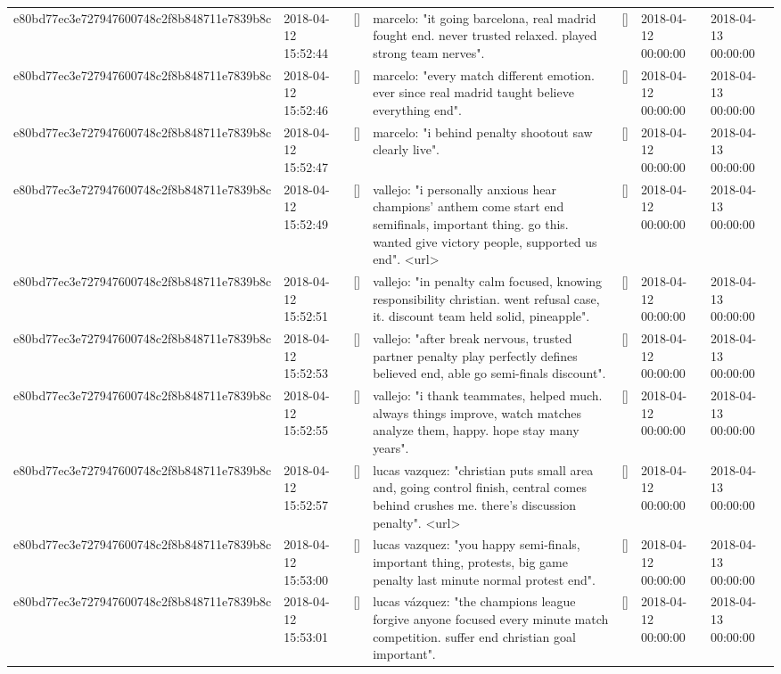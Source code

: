 \begin{tabular}{lllllll}
e80bd77ec3e727947600748c2f8b848711e7839b8c & 2018-04-12 15:52:44 & [] & marcelo: "it going barcelona, real madrid fought end. never trusted relaxed. played strong team nerves". & [] & 2018-04-12 00:00:00 & 2018-04-13 00:00:00 \\
e80bd77ec3e727947600748c2f8b848711e7839b8c & 2018-04-12 15:52:46 & [] & marcelo: "every match different emotion. ever since real madrid taught believe everything end". & [] & 2018-04-12 00:00:00 & 2018-04-13 00:00:00 \\
e80bd77ec3e727947600748c2f8b848711e7839b8c & 2018-04-12 15:52:47 & [] & marcelo: "i behind penalty shootout saw clearly live". & [] & 2018-04-12 00:00:00 & 2018-04-13 00:00:00 \\
e80bd77ec3e727947600748c2f8b848711e7839b8c & 2018-04-12 15:52:49 & [] & vallejo: "i personally anxious hear champions' anthem come start end semifinals, important thing. go this. wanted give victory people, supported us end". <url> & [] & 2018-04-12 00:00:00 & 2018-04-13 00:00:00 \\
e80bd77ec3e727947600748c2f8b848711e7839b8c & 2018-04-12 15:52:51 & [] & vallejo: "in penalty calm focused, knowing responsibility christian. went refusal case, it. discount team held solid, pineapple". & [] & 2018-04-12 00:00:00 & 2018-04-13 00:00:00 \\
e80bd77ec3e727947600748c2f8b848711e7839b8c & 2018-04-12 15:52:53 & [] & vallejo: "after break nervous, trusted partner penalty play perfectly defines believed end, able go semi-finals discount". & [] & 2018-04-12 00:00:00 & 2018-04-13 00:00:00 \\
e80bd77ec3e727947600748c2f8b848711e7839b8c & 2018-04-12 15:52:55 & [] & vallejo: "i thank teammates, helped much. always things improve, watch matches analyze them, happy. hope stay many years". & [] & 2018-04-12 00:00:00 & 2018-04-13 00:00:00 \\
e80bd77ec3e727947600748c2f8b848711e7839b8c & 2018-04-12 15:52:57 & [] & lucas vazquez: "christian puts small area and, going control finish, central comes behind crushes me. there's discussion penalty". <url> & [] & 2018-04-12 00:00:00 & 2018-04-13 00:00:00 \\
e80bd77ec3e727947600748c2f8b848711e7839b8c & 2018-04-12 15:53:00 & [] & lucas vazquez: "you happy semi-finals, important thing, protests, big game penalty last minute normal protest end". & [] & 2018-04-12 00:00:00 & 2018-04-13 00:00:00 \\
e80bd77ec3e727947600748c2f8b848711e7839b8c & 2018-04-12 15:53:01 & [] & lucas vázquez: "the champions league forgive anyone focused every minute match competition. suffer end christian goal important". & [] & 2018-04-12 00:00:00 & 2018-04-13 00:00:00 \\

\end{tabular}
